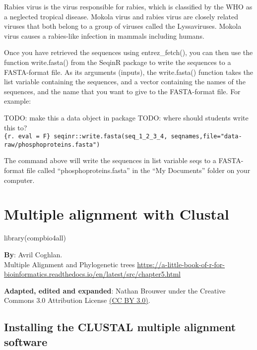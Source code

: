 \documentclass[
]{book}
\newenvironment{Shaded}{\begin{snugshade}}{\end{snugshade}}
\newcommand{\FunctionTok}[1]{\textcolor[rgb]{0.00,0.00,0.00}{#1}}
\newcommand{\NormalTok}[1]{#1}
\begin{document}
Rabies virus is the virus responsible for rabies, which is classified by the WHO as a neglected tropical disease. Mokola virus and rabies virus are closely related viruses that both belong to a group of viruses called the Lyssaviruses. Mokola virus causes a rabies-like infection in mammals including humans.

Once you have retrieved the sequences using entrez\_fetch(), you can then use the function write.fasta() from the SeqinR package to write the sequences to a FASTA-format file. As its arguments (inputs), the write.fasta() function takes the list variable containing the sequences, and a vector containing the names of the sequences, and the name that you want to give to the FASTA-format file. For example:

TODO: make this a data object in package
TODO: where should students write this to?
\texttt{\{r.\ eval\ =\ F\}\ seqinr::write.fasta(seq\_1\_2\_3\_4,\ seqnames,file="data-raw/phosphoproteins.fasta")}

The command above will write the sequences in list variable seqs to a FASTA-format file called ``phosphoproteins.fasta'' in the ``My Documents'' folder on your computer.

\hypertarget{multiple-alignment-with-clustal}{%
\chapter{Multiple alignment with Clustal}\label{multiple-alignment-with-clustal}}

\begin{Shaded}
\begin{Highlighting}[]
\FunctionTok{library}\NormalTok{(compbio4all)}
\end{Highlighting}
\end{Shaded}

\textbf{By}: Avril Coghlan.\\
Multiple Alignment and Phylogenetic trees
\url{https://a-little-book-of-r-for-bioinformatics.readthedocs.io/en/latest/src/chapter5.html}

\textbf{Adapted, edited and expanded}: Nathan Brouwer under the Creative Commons 3.0 Attribution License \href{https://creativecommons.org/licenses/by/3.0/}{(CC BY 3.0)}.

\hypertarget{installing-the-clustal-multiple-alignment-software}{%
\section{Installing the CLUSTAL multiple alignment software}\label{installing-the-clustal-multiple-alignment-software}}
\end{document}
